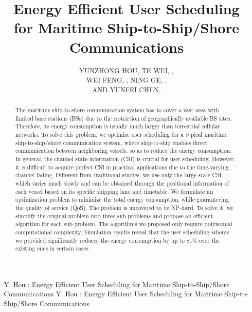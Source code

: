 \documentclass{ieeeaccess}
\begin{document}

\title{Energy Efficient User Scheduling for Maritime Ship-to-Ship/Shore Communications}
\author{\uppercase{Yunzhong Hou}, 
\uppercase{Te Wei}, ,\\
\uppercase{Wei Feng}, , 
\uppercase{Ning Ge}, ,
\\ \uppercase{and Yunfei Chen}, }

\address[1]{Tsinghua National Laboratory for Information Science and Technology, Tsinghua University, Beijing 100084, P. R. China}
\address[2]{School of Engineering, University of Warwick, Coventry CV4 7AL, U.K.}


\markboth
{Y. Hou \headeretal: Energy Efficient User Scheduling for Maritime Ship-to-Ship/Shore Communications}
{Y. Hou \headeretal: Energy Efficient User Scheduling for Maritime Ship-to-Ship/Shore Communications}


\begin{abstract}

The maritime ship-to-shore communication system has to cover a vast area with limited base stations (BSs) due to the restriction of geographically available BS sites. Therefore, its energy consumption is usually much larger than terrestrial cellular networks. To solve this problem, we optimize user scheduling for a typical maritime ship-to-ship/shore communication system, where ship-to-ship enables direct communication between neighboring vessels, so as to reduce the energy consumption. 
In general, the channel state information (CSI) is crucial for user scheduling. However, it is difficult to acquire perfect CSI in practical applications due to the time-varying channel fading. Different from traditional studies, we use only the large-scale CSI, which varies much slowly and can be obtained through the positional information of each vessel based on its specific shipping lane and timetable. 
We formulate an optimization problem to minimize the total energy consumption, while guaranteeing the quality of service (QoS). The problem is uncovered to be NP-hard. To solve it, we simplify the original problem into three sub-problems and propose an efficient algorithm for each sub-problem. The algorithms we proposed only require polynomial computational complexity. Simulation results reveal that the user scheduling scheme we provided significantly reduces the energy consumption by up to 81\% over the existing ones in certain cases.
\end{abstract}
\end{document}
